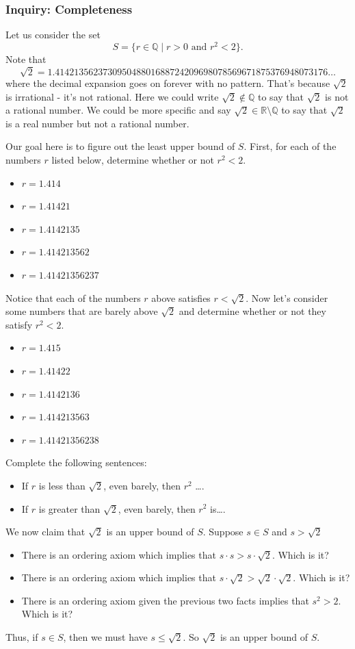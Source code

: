 \documentclass[11pt]{article}
\newenvironment{task}
	{\begin{mdframed}[linecolor=lightgray, linewidth=3pt]\raggedright}
	{\end{mdframed}}
\theoremstyle{definition}
\begin{document}
\subsubsection{Inquiry: Completeness}
\begin{task}
  Let us consider the set
  \[ S = \{ r\in \mathbb{Q} \mid r > 0 \text{ and } r^2 < 2 \}. \]
  Note that 
  \[ \sqrt{2} = 1.414213562373095048801688724209698078569671875376948073176\dots\]
  where the decimal expansion goes on forever with no pattern. That's because $\sqrt{2}$ is irrational - it's not rational. Here we could
  write $\sqrt{2}\not\in\mathbb{Q}$ to say that $\sqrt{2}$ is not a rational number. We could be more specific and say
  $\sqrt{2}\in\mathbb{R}\setminus \mathbb{Q}$ to say that $\sqrt{2}$ is a real number but not a rational number.

  Our goal here is to figure out the least upper bound of $S$. First, for each of the numbers $r$ listed below, determine whether or not
  $r^2 < 2$.
  \begin{itemize}
    \item $r=1.414$
    \item $r=1.41421$
    \item $r=1.4142135$
    \item $r=1.414213562$
    \item $r=1.41421356237$
  \end{itemize}
  Notice that each of the numbers $r$ above satisfies $r < \sqrt{2}$. Now let's consider some numbers that are barely above $\sqrt{2}$ and
  determine whether or not they satisfy $r^2 < 2$.
  \begin{itemize}
    \item $r=1.415$
    \item $r=1.41422$
    \item $r=1.4142136$
    \item $r=1.414213563$
    \item $r=1.41421356238$
  \end{itemize}
  Complete the following sentences:
  \begin{itemize}
    \item If $r$  is less than $\sqrt{2}$, even barely, then $r^2$ \dots.
    \item If $r$  is greater than $\sqrt{2}$, even barely, then $r^2$ is\dots.
  \end{itemize}
  We now claim that $\sqrt{2}$ is an upper bound of $S$. Suppose $s\in S$ and $s > \sqrt{2}$
  \begin{itemize}
    \item There is an ordering axiom which implies that $s\cdot s > s\cdot \sqrt{2}$. Which is it?
    \item There is an ordering axiom which implies that $s\cdot \sqrt{2} > \sqrt{2}\cdot \sqrt{2}$. Which is it?
    \item There is an ordering axiom given the previous two facts implies that $s^2 > 2$. Which is it?
  \end{itemize}
  Thus, if $s\in S$, then we must have $s\leq \sqrt{2}$. So $\sqrt{2}$ is an upper bound of $S$. 
  

\end{task}
\end{document}
